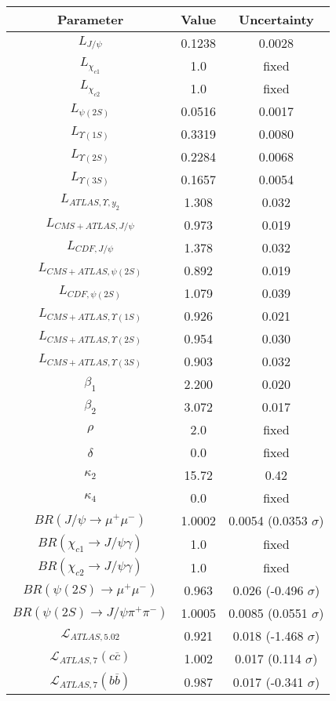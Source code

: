 \begin{table}[h!]
\centering
\begin{tabular}{c|c|c}
Parameter & Value & Uncertainty \\
\hline
$L_{J/\psi}$ & 0.1238 & 0.0028 \\
$L_{\chi_{c1}}$ & 1.0 & fixed \\
$L_{\chi_{c2}}$ & 1.0 & fixed \\
$L_{\psi(2S)}$ & 0.0516 & 0.0017 \\
$L_{\Upsilon(1S)}$ & 0.3319 & 0.0080 \\
$L_{\Upsilon(2S)}$ & 0.2284 & 0.0068 \\
$L_{\Upsilon(3S)}$ & 0.1657 & 0.0054 \\
$L_{ATLAS,\Upsilon,y_2}$ & 1.308 & 0.032 \\
$L_{CMS+ATLAS,J/\psi}$ & 0.973 & 0.019 \\
$L_{CDF,J/\psi}$ & 1.378 & 0.032 \\
$L_{CMS+ATLAS,\psi(2S)}$ & 0.892 & 0.019 \\
$L_{CDF,\psi(2S)}$ & 1.079 & 0.039 \\
$L_{CMS+ATLAS,\Upsilon(1S)}$ & 0.926 & 0.021 \\
$L_{CMS+ATLAS,\Upsilon(2S)}$ & 0.954 & 0.030 \\
$L_{CMS+ATLAS,\Upsilon(3S)}$ & 0.903 & 0.032 \\
$\beta_1$ & 2.200 & 0.020 \\
$\beta_2$ & 3.072 & 0.017 \\
$\rho$ & 2.0 & fixed \\
$\delta$ & 0.0 & fixed \\
$\kappa_2$ & 15.72 & 0.42 \\
$\kappa_4$ & 0.0 & fixed \\
$BR(J/\psi\rightarrow\mu^+\mu^-)$ & 1.0002 & 0.0054 (0.0353 $\sigma$) \\
$BR(\chi_{c1}\rightarrow J/\psi\gamma)$ & 1.0 & fixed \\
$BR(\chi_{c2}\rightarrow J/\psi\gamma)$ & 1.0 & fixed \\
$BR(\psi(2S)\rightarrow\mu^+\mu^-)$ & 0.963 & 0.026 (-0.496 $\sigma$) \\
$BR(\psi(2S)\rightarrow J/\psi\pi^+\pi^-)$ & 1.0005 & 0.0085 (0.0551 $\sigma$) \\
$\mathcal L_{ATLAS,5.02}$ & 0.921 & 0.018 (-1.468 $\sigma$) \\
$\mathcal L_{ATLAS,7}(c\overline c)$ & 1.002 & 0.017 (0.114 $\sigma$) \\
$\mathcal L_{ATLAS,7}(b\overline b)$ & 0.987 & 0.017 (-0.341 $\sigma$) \\

\end{tabular}
\end{table}

